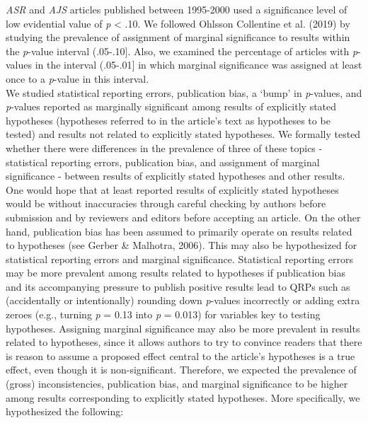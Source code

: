 \documentclass[
  12pt,
]{article}
\begin{document}
\emph{ASR} and \emph{AJS} articles published between 1995-2000 used a
significance level of low evidential value of \emph{p} \textless{} .10.
We followed Ohlsson Collentine et al. (2019) by studying the prevalence
of assignment of marginal significance to results within the
\emph{p}-value interval (.05-.10{]}. Also, we examined the percentage of
articles with \emph{p}-values in the interval (.05-.01{]} in which
marginal significance was assigned at least once to a \emph{p}-value in
this interval.\\
\hspace*{0.333em}\hspace*{0.333em}\hspace*{0.333em}\hspace*{0.333em}We
studied statistical reporting errors, publication bias, a `bump' in
\emph{p}-values, and \emph{p}-values reported as marginally significant
among results of explicitly stated hypotheses (hypotheses referred to in
the article's text as hypotheses to be tested) and results not related
to explicitly stated hypotheses. We formally tested whether there were
differences in the prevalence of three of these topics - statistical
reporting errors, publication bias, and assignment of marginal
significance - between results of explicitly stated hypotheses and other
results. One would hope that at least reported results of explicitly
stated hypotheses would be without inaccuracies through careful checking
by authors before submission and by reviewers and editors before
accepting an article. On the other hand, publication bias has been
assumed to primarily operate on results related to hypotheses (see
Gerber \& Malhotra, 2006). This may also be hypothesized for statistical
reporting errors and marginal significance. Statistical reporting errors
may be more prevalent among results related to hypotheses if publication
bias and its accompanying pressure to publish positive results lead to
QRPs such as (accidentally or intentionally) rounding down
\emph{p}-values incorrectly or adding extra zeroes (e.g., turning
\emph{p} = 0.13 into \emph{p} = 0.013) for variables key to testing
hypotheses. Assigning marginal significance may also be more prevalent
in results related to hypotheses, since it allows authors to try to
convince readers that there is reason to assume a proposed effect
central to the article's hypotheses is a true effect, even though it is
non-significant. Therefore, we expected the prevalence of (gross)
inconsistencies, publication bias, and marginal significance to be
higher among results corresponding to explicitly stated hypotheses. More
specifically, we hypothesized the following:\\
\end{document}
